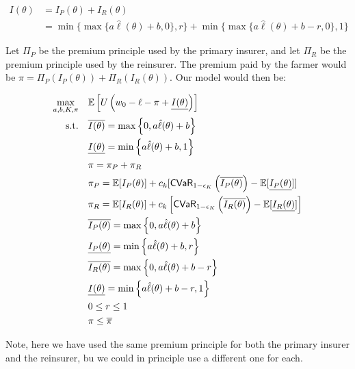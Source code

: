 \documentclass[11pt]{article}
\begin{document}
  \begin{align*}
    I(\theta) &= I_P(\theta) + I_R(\theta)\\
    &= \min \{ \max \{ a\hat{\ell}(\theta) + b, 0 \},r \} + \min \{ \max \{a\hat{\ell}(\theta) + b - r, 0 \},1 \}
  \end{align*}
  
  Let $\Pi_P$ be the premium principle used by the primary insurer, and let $\Pi_R$ be the premium principle used by the reinsurer. The premium paid by the farmer would be $\pi = \Pi_P(I_P(\theta)) + \Pi_R(I_R(\theta)).$ Our model would then be: 

  \begin{align}
    \max_{a,b,K,\pi} &\quad \mathbb{E} \left [  U\left(w_0 - \ell - \pi  +  \underline{I(\theta)} \right) \right ]\\
    \text{s.t.} & \quad \overline{I(\theta)} = \max \left \{0,a\hat{\ell}(\theta) + b \right \} \nonumber\\
    & \quad \underline{I(\theta)} = \min \left \{a\hat{\ell}(\theta)+b,1 \right \} \nonumber\\
    & \quad \pi = \pi_P + \pi_R\\
    & \quad \pi_P = \mathbb{E}[I_P(\theta)] + c_k[{\sf CVaR}_{1-\epsilon_K} \left( \overline{I_P(\theta)} \right) - \mathbb{E}[\underline{I_P(\theta)}]]\\
    & \quad \pi_R = \mathbb{E}[I_R(\theta)] + c_k \left [{\sf CVaR}_{1-\epsilon_K} \left( \overline{I_R(\theta)} \right) - \mathbb{E}[\underline{I_R(\theta)}] \right ] \\
    & \quad \overline{I_P(\theta)} = \max \left \{0,a\hat{\ell}(\theta) + b \right \} \nonumber\\
    & \quad \underline{I_P(\theta)} = \min \left \{a\hat{\ell}(\theta)+b,r \right \} \nonumber\\
    & \quad \overline{I_R(\theta)} = \max \left \{0,a\hat{\ell}(\theta) + b -r \right \} \nonumber\\
    & \quad \underline{I(\theta)} = \min \left \{a\hat{\ell}(\theta)+b - r,1 \right \} \nonumber\\
    & \quad  0 \leq r \leq 1\\
    & \quad \pi \leq \overline{\pi}
\end{align}

Note, here we have used the same premium principle for both the primary insurer and the reinsurer, bu we could in principle use a different one for each. 

\end{document}
